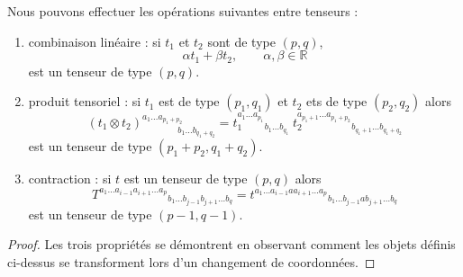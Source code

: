 \documentclass[a4paper,11pt]{report}
\begin{document}
                \begin{prop}\begin{leftbar}
                    Nous pouvons effectuer les opérations suivantes entre tenseurs :
                    \begin{enumerate}[label = \textit{\roman*)}]
                        \item combinaison linéaire : si $t_1$ et $t_2$ sont de type $(p,q)$,
                        \begin{equation}
                            \alpha t_1 + \beta t_2, \qquad\alpha,\beta\in\mathbb{R}
                        \end{equation} 
                        est un tenseur de type $(p,q)$.
                        \item produit tensoriel : si $t_1$ est de type $(p_1,q_1)$ et $t_2$ ets de type $(p_2,q_2)$ alors
                        \begin{equation}
                            (t_1\otimes t_2)_{\qquad\qquad b_1\dots b_{q_1+q_2}}^{a_1\dots a_{p_1+p_2}} =
                            t_1^{a_1\dots a_{p_1}}{}_{b_1\dots b_{q_1}}~t_2^{a_{p_1+1}\dots a_{p_1+p_2}}{}_{b_{q_1+1}\dots b_{q_1+q_2}}
                        \end{equation}
                        est un tenseur de type $(p_1+p_2,q_1+q_2)$.
                        \item contraction : si $t$ est un tenseur de type $(p,q)$ alors
                        \begin{equation}
                            T^{a_1\dots a_{i-1}a_{i+1}\dots a_p}{}_{b_1\dots b_{j-1}b_{j+1}\dots b_q} = t^{a_1\dots a_{i-1} a a_{i+1}\dots a_p}{}_{b_1\dots b_{j-1} a b_{j+1}\dots b_q}
                        \end{equation}
                        est un tenseur de type $(p-1,q-1)$.
                    \end{enumerate}
                \end{leftbar}\end{prop}
                
                \begin{proof}
                    Les trois propriétés se démontrent en observant comment les objets définis ci-dessus se transforment lors d'un changement de coordonnées.
                \end{proof}
                
\end{document}
